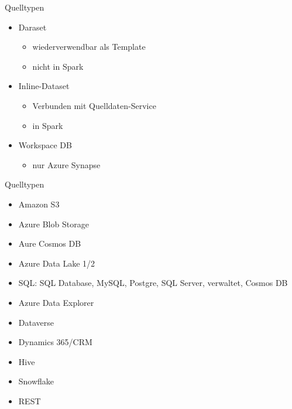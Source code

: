 \begin{flashcard}[Definition]{Quelltypen}
  \begin{itemize}
    \item Daraset
      \begin{itemize}
        \item wiederverwendbar als Template
        \item nicht in Spark
      \end{itemize}
    \item Inline-Dataset
      \begin{itemize}
        \item Verbunden mit Quelldaten-Service
        \item in Spark
      \end{itemize}
    \item Workspace DB
      \begin{itemize}
        \item nur Azure Synapse
      \end{itemize}
  \end{itemize}
\end{flashcard}

\begin{flashcard}[Definition]{Quelltypen}
  \begin{itemize}
    \item Amazon S3
    \item Azure Blob Storage
    \item Aure Cosmos DB
    \item Azure Data Lake 1/2
    \item SQL: SQL Database, MySQL, Postgre, SQL Server, verwaltet, Cosmos DB
    \item Azure Data Explorer
    \item Dataverse
    \item Dynamics 365/CRM
    \item Hive
    \item Snowflake
    \item REST
  \end{itemize}
\end{flashcard}


